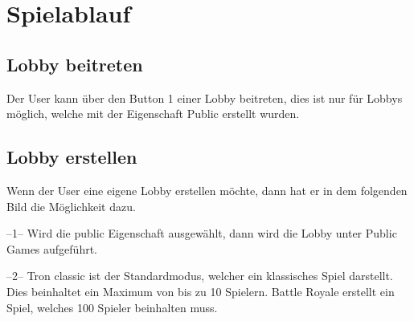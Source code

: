 \documentclass[11pt,ngerman]{article}
\begin{document}
    
    \section{Spielablauf}
    
    
    \subsection{Lobby beitreten}
    
    Der User kann über den Button 1 einer Lobby beitreten, dies ist nur für Lobbys möglich, welche mit der Eigenschaft Public erstellt wurden.
    
    
    \subsection{Lobby erstellen}
    
    Wenn der User eine eigene Lobby erstellen möchte, dann hat er in dem folgenden Bild die Möglichkeit dazu.
    
    
    --1-- Wird die public Eigenschaft ausgewählt, dann wird die Lobby unter Public Games aufgeführt. 
    
    --2-- Tron classic ist der Standardmodus, welcher ein klassisches Spiel darstellt. Dies beinhaltet ein Maximum von bis zu 10 Spielern. Battle Royale erstellt ein Spiel, welches 100 Spieler beinhalten muss.
    
\end{document}
